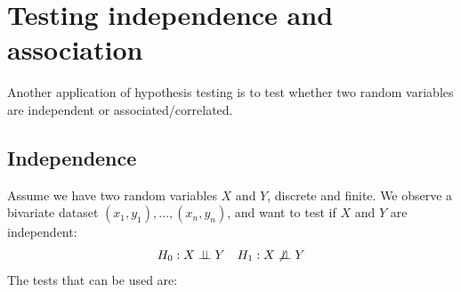 \section{Testing independence and association}

Another application of hypothesis testing is to test whether two random variables are independent or associated/correlated.

\subsection{Independence}

Assume we have two random variables $X$ and $Y$, discrete and finite. We observe a bivariate dataset $(x_1, y_1), \ldots, (x_n, y_n)$, and want to test if $X$ and $Y$ are independent:
\begin{align*}
    &H_0 : X \perp \!\!\! \perp Y &H_1 : X \not\perp \!\!\! \perp Y
\end{align*}
The tests that can be used are:
